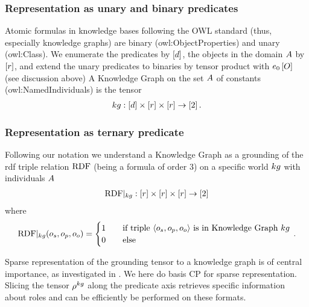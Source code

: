 \subsubsection{Representation as unary and binary predicates}

Atomic formulas in knowledge bases following the OWL standard (thus, especially knowledge graphs) are binary (owl:ObjectProperties) and unary (owl:Class).
We enumerate the predicates by $[d]$, the objects in the domain $A$ by $[r]$, and extend the unary predicates to binaries by tensor product with $e_{0}\left[O\right]$ (see discussion above)
A Knowledge Graph on the set $A$ of constants (owl:NamedIndividuals) is the tensor
\begin{align*}
	kg :  [d] \times [r] \times [r] \rightarrow [2] \, . 
\end{align*}


\subsubsection{Representation as ternary predicate}

Following our notation we understand a Knowledge Graph as a grounding of the rdf triple relation $\mathrm{RDF}$ (being a formula of order 3) on a specific world $kg$ with individuals $A$
\begin{align*}
	{\mathrm{RDF}}|_{kg} : [r] \times [r] \times [r] \rightarrow [2]
\end{align*}
where
\begin{align*}
	{\mathrm{RDF}}|_{kg}(o_{s}, o_{p}, o_{o}) =
	\begin{cases}
	1 \quad & \text{if triple $\braket{o_{s}, o_{p}, o_{o}}$ is in Knowledge Graph $kg$} \\
	0  \quad & \text{else}
	\end{cases} \, .
\end{align*} 


Sparse representation of the grounding tensor to a knowledge graph is of central importance, as investigated in \cite{bigerl_tentris_2020}.
We here do basis CP for sparse representation.
Slicing the tensor $\rho^{kg}$ along the predicate axis retrieves specific information about roles and can be efficiently be performed on these formats.
 
